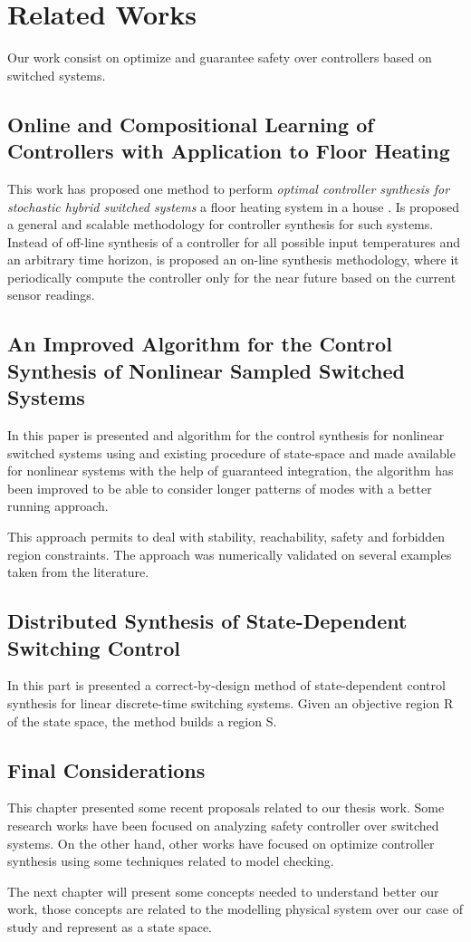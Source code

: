 \chapter{Related Works}
\label{ch:relatedWorks}
Our work consist on optimize and guarantee safety over
 controllers based on switched systems.

\section{Online and Compositional Learning of
Controllers with Application to Floor Heating}
\label{sec:mapInterpretation}
This work has proposed one method to perform  \textit{optimal controller synthesis for stochastic hybrid switched systems} \eg a floor heating system in a house \citep{larsen2016online}. Is proposed a general and scalable methodology for controller synthesis for such systems. Instead of off-line synthesis of a controller for all possible input temperatures and an arbitrary time horizon, is proposed an on-line synthesis methodology, where it periodically compute the controller only for the near future based on the current sensor readings.

\section{An Improved Algorithm for the Control Synthesis
of Nonlinear Sampled Switched Systems}
\label{sec:chartInterpretation}
In this paper is presented and algorithm for the control synthesis for nonlinear switched systems using and existing procedure of state-space and made available for nonlinear systems with the help of guaranteed integration, the algorithm has been improved to be able to consider longer patterns of modes with a better running approach. 

This approach permits to deal with stability, reachability, safety and forbidden region constraints. The approach was numerically validated on several examples taken from the literature.\citep{le2017improved}


\section{Distributed Synthesis of State-Dependent
Switching Control}
\label{sec:intApps}
In this part is presented a correct-by-design method of state-dependent control synthesis for linear discrete-time switching systems. Given an objective region R of the state space, the method builds a region S. \citep{le2016distributed}

\section{Final Considerations}
This chapter presented some recent proposals related to our thesis work. Some research works have been focused on analyzing safety controller over switched systems. On the other hand, other works have focused on optimize controller synthesis using some techniques related to model checking. 

The next chapter will present some concepts needed to understand better our work, those concepts are related to the modelling physical system over our case of study and represent as a state space.
